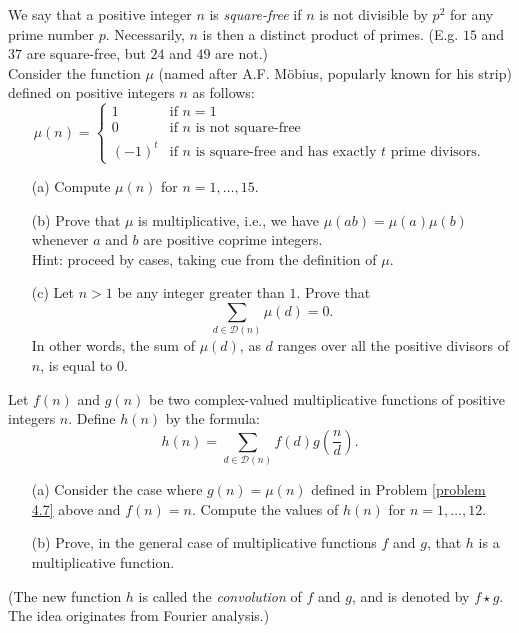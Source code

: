 \begin{problem}\label{problem 4.7}
We say that a positive integer $n$ is \emph{square-free} if $n$ is not divisible by $p^2$ for any prime number $p$. Necessarily, $n$ is then a distinct product of primes. (E.g. $15$ and $37$ are square-free, but $24$ and $49$ are not.)\\[0.5em]
Consider the function $\mu$ (named after A.F. M{\"o}bius, popularly known for his strip) defined on positive integers $n$ as follows:
\[\mu(n) = \begin{cases}1 & \text{if $n = 1$}\\[0.5em] 0 & \text{if $n$ is not square-free}\\[0.5em] (-1)^t & \text{if $n$ is square-free and has exactly $t$ prime divisors.} \end{cases}\]
\begin{itemize}
\item[(a)] Compute $\mu(n)$ for $n = 1,\ldots,15$.
\item[(b)] Prove that $\mu$ is multiplicative, i.e., we have $\mu(ab) = \mu(a)\mu(b)$ whenever $a$ and $b$ are positive coprime integers.\\
{\footnotesize Hint: proceed by cases, taking cue from the definition of $\mu$.}
\item[(c)] Let $n > 1$ be any integer greater than $1$. Prove that
\[\sum_{d\in \mathscr{D}(n)} \mu(d) = 0.\]
In other words, the sum of $\mu(d)$, as $d$ ranges over all the positive divisors of $n$, is equal to $0$. 
\end{itemize}
\end{problem}

\vspace*{0.1in}

\begin{problem}\label{problem 4.8}
Let $f(n)$ and $g(n)$ be two complex-valued multiplicative functions of positive integers $n$. Define $h(n)$ by the formula:
\[h(n) = \sum_{d\in \mathscr{D}(n)}f(d)g\left(\frac{n}{d}\right).\]
\begin{itemize}
\item[(a)] Consider the case where $g(n) = \mu(n)$ defined in Problem \ref{problem 4.7} above and $f(n) = n$. Compute the values of $h(n)$ for $n = 1,\ldots,12$.
\item[(b)] Prove, in the general case of multiplicative functions $f$ and $g$, that $h$ is a multiplicative function.
\end{itemize}
(The new function $h$ is called the \textit{convolution} of $f$ and $g$, and is denoted by $f \star g$. The idea originates from Fourier analysis.)
\end{problem}